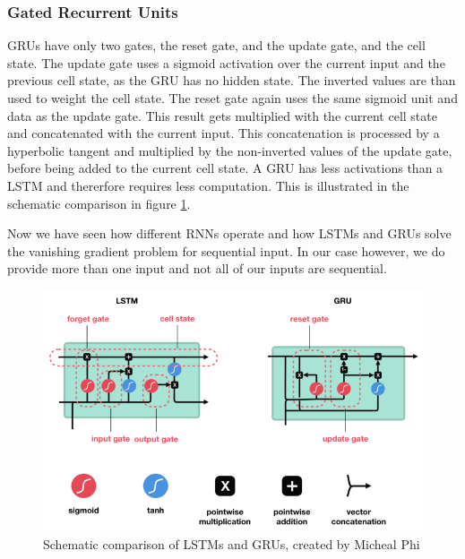 \documentclass[
	ngerman,
	ruledheaders=section,%
	class=report,%
	thesis={type=bachelor},%
	accentcolor=9c,%
	custommargins=true,%
	marginpar=false,%
	parskip=half-,%
	fontsize=11pt,%
	twoside
]{tudapub}
\begin{document}
\subsubsection{Gated Recurrent Units}

GRUs have only two gates, the reset gate, and the update gate, and the cell state. \cite{phiIllustratedGuideLSTM2020}
The update gate uses a sigmoid activation over the current input and the previous cell state, as the GRU has no hidden state.
The inverted values are than used to weight the cell state.
The reset gate again uses the same sigmoid unit and data as the update gate.
This result gets multiplied with the current cell state and concatenated with the current input.
This concatenation is processed by a hyperbolic tangent and multiplied by the non-inverted values of the update gate, before being added to the current cell state.
A GRU has less activations than a LSTM and thererfore requires less computation.
This is illustrated in the schematic comparison in figure \ref{fig:LSTMvGRU}.

Now we have seen how different RNNs operate and how LSTMs and GRUs solve the vanishing gradient problem for sequential input.
In our case however, we do provide more than one input and not all of our inputs are sequential.

\begin{figure}
    \includegraphics[width=\textwidth]{LSTMvGRU.png}
    \caption{Schematic comparison of LSTMs and GRUs, created by Micheal Phi \cite{phiIllustratedGuideLSTM2020}}
    \label{fig:LSTMvGRU}
\end{figure}
\end{document}
